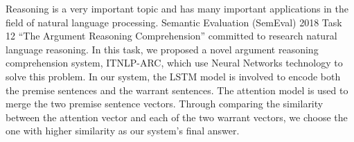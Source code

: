 Reasoning is a very important topic and has many important applications in the field of natural language processing. Semantic Evaluation (SemEval) 2018 Task 12 ``The Argument Reasoning Comprehension'' committed to research natural language reasoning. In this task, we proposed a novel argument reasoning comprehension system, ITNLP-ARC, which use Neural Networks technology to solve this problem. In our system, the LSTM model is involved to encode both the premise sentences and the warrant sentences. The attention model is used to merge the two premise sentence vectors. Through comparing the similarity between the attention vector and each of the two warrant vectors, we choose the one with higher similarity as our system's final answer.
